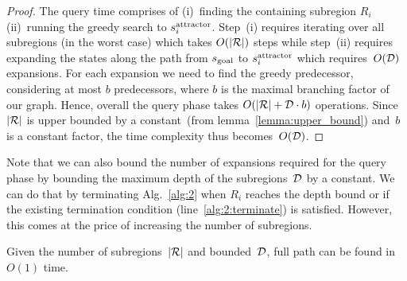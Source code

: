 \documentclass[a4paper]{report}
\begin{document}
\begin{proof}
The query time comprises of 
(i)~finding the containing subregion $R_i$
(ii)~running the greedy search to $s^{\text{attractor}}_i$.
Step~(i) requires iterating over all subregions (in the worst case) which takes $O(|\mathcal{R}|)$ steps while 
step~(ii) requires expanding the states along the path from $s_{\text{goal}}$ to $s^{\text{attractor}}_i$ which requires~$O(\mathcal{D})$ expansions.
For each expansion we need to find the greedy predecessor, considering at most $b$ predecessors, where $b$ is the maximal branching factor of our graph.
Hence, overall the query phase takes $O(|\mathcal{R}| + \mathcal{D} \cdot b)$ operations. Since~$|\mathcal{R}|$ is upper bounded by a constant~(from lemma~\ref{lemma:upper_bound}) and~$b$ is a constant factor, the time complexity thus becomes~$O(\mathcal{D})$.
\end{proof}

Note that we can also bound the number of expansions required for the query phase by bounding the maximum depth of the subregions~$\mathcal{D}$ by a constant. We can do that by terminating Alg.~\ref{alg:2} when $R_i$ reaches the depth bound or if the existing termination condition (line~\ref{alg:2:terminate}) is satisfied. However, this comes at the price of increasing the number of subregions.

\vspace{2mm}
\begin{lemma}
\label{lemma:OrderR}
	Given the number of subregions~$|\mathcal{R}|$ and bounded~$\mathcal{D}$, full path can be found in~$O(1)$ time.
\end{lemma}

%

\end{document}
